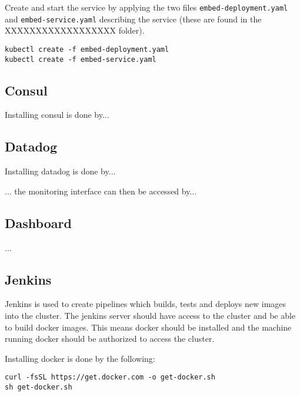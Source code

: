 \documentclass[Report.tex]{subfiles}
\begin{document}
Create and start the service by applying the two files \texttt{embed-deployment.yaml} and \texttt{embed-service.yaml} describing the service (these are found in the XXXXXXXXXXXXXXXXXX folder).
\begin{lstlisting}[style=terminal]
kubectl create -f embed-deployment.yaml
kubectl create -f embed-service.yaml
\end{lstlisting}


\subsection{Consul}
Installing consul is done by...


\subsection{Datadog}
Installing datadog is done by...

... the monitoring interface can then be accessed by...

\subsection{Dashboard}
...

\subsection{Jenkins}
Jenkins is used to create pipelines which builds, tests and deploys new images into the cluster.
The jenkins server should have access to the cluster and be able to build docker images. This means docker should be installed and the machine running docker should be authorized to access the cluster.

Installing docker is done by the following:
\begin{lstlisting}[style=terminal]
curl -fsSL https://get.docker.com -o get-docker.sh
sh get-docker.sh
\end{lstlisting}
\end{document}
